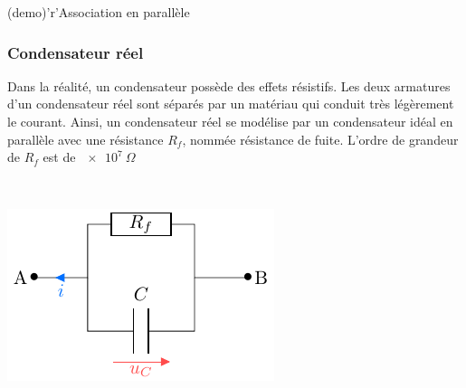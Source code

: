 \documentclass[../../main/main.tex]{subfiles}
\begin{document}
\begin{tcbraster}[raster columns=2, raster equal height=rows]
\begin{tcb*}[label=prop:cpara]
\begin{center}
{			}%
		\end{center}
	\end{tcb*}
	\begin{tcb*}[label=demo:cpara](demo)'r'{Association en parallèle}
	\end{tcb*}
\end{tcbraster}

\subsubsection{Condensateur réel}

\noindent
\begin{minipage}[t]{.69\linewidth}
	Dans la réalité, un condensateur possède des effets résistifs.
	Les deux armatures d'un condensateur réel sont séparés par un matériau
	qui conduit très légèrement le courant. Ainsi, un condensateur réel se
	modélise par un condensateur idéal en parallèle avec une résistance $R_f$,
	nommée résistance de fuite.
	\smallbreak
	L'ordre de grandeur de $R_f$ est de $\SI{e7}{\Omega}$
\end{minipage}
\hfill
\begin{minipage}[t]{.30\linewidth}
	~
	\vspace{-40pt}
	\begin{center}
		\includegraphics[width=\linewidth]{creel}
		\label{fig:creel}
	\end{center}
\end{minipage}
\end{document}

